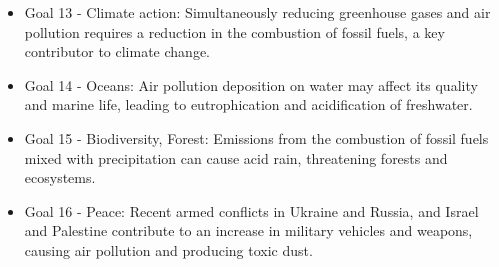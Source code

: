 \begin{itemize}
    \item Goal 13 - Climate action: Simultaneously reducing greenhouse gases and air pollution requires a reduction in the combustion of fossil fuels, a key contributor to climate change.
    \item Goal 14 - Oceans: Air pollution deposition on water may affect its quality and marine life, leading to eutrophication and acidification of freshwater.
    \item Goal 15 - Biodiversity, Forest: Emissions from the combustion of fossil fuels mixed with precipitation can cause acid rain, threatening forests and ecosystems.
    \item Goal 16 - Peace: Recent armed conflicts in Ukraine and Russia, and Israel and Palestine contribute to an increase in military vehicles and weapons, causing air pollution and producing toxic dust.
\end{itemize}

